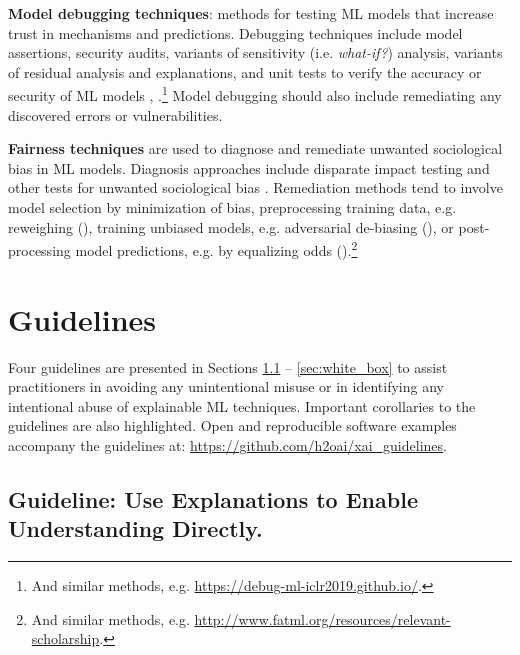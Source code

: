 \documentclass[sigconf]{acmart}
\begin{document}
\vspace{-8pt}
\noindent\textbf{Model debugging techniques}: methods for testing ML models that increase trust in mechanisms and predictions. Debugging techniques include model assertions, security audits, variants of sensitivity (i.e. \textit{what-if?}) analysis, variants of residual analysis and explanations, and unit tests to verify the accuracy or security of ML models \cite{modeltracker}, \cite{kangdebugging}.\footnote{And similar methods, e.g. \url{https://debug-ml-iclr2019.github.io/}.} Model debugging should also include remediating any discovered errors or vulnerabilities.

\vspace{-8pt}
\noindent\textbf{Fairness techniques} are used to diagnose and remediate unwanted sociological bias in ML models. Diagnosis approaches include disparate impact testing and other tests for unwanted sociological bias \cite{feldman2015certifying}. Remediation methods tend to involve model selection by minimization of bias, preprocessing training data, e.g. reweighing (\citet{kamiran2012data}), training unbiased models, e.g. adversarial de-biasing (\citet{zhang2018mitigating}), or post-processing model predictions, e.g. by equalizing odds (\citet{hardt2016equality}).\footnote{And similar methods, e.g. \url{http://www.fatml.org/resources/relevant-scholarship}.} 

\section{Guidelines}

Four guidelines are presented in Sections \ref{sec:trust} -- \ref{sec:white_box} to assist practitioners in avoiding any unintentional misuse or in identifying any intentional abuse of explainable ML techniques. Important corollaries to the guidelines are also highlighted. Open and reproducible software examples accompany the guidelines at: \url{https://github.com/h2oai/xai_guidelines}.

\subsection{Guideline: Use Explanations to Enable Understanding Directly.} \label{sec:trust}
\end{document}
